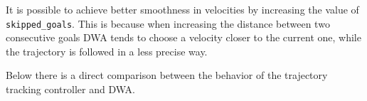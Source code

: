 \documentclass[11pt,a4paper]{article}
\begin{document}
It is possible to achieve better smoothness in velocities by increasing the value
of \texttt{skipped\_goals}.
This is because when increasing the distance between two consecutive goals DWA tends to choose
a velocity closer to the current one, while the trajectory is followed in a less precise way.

Below there is a direct comparison between the behavior of the trajectory tracking controller and DWA.\\

\begin{figure}[H]
    \centering
    \quad
\end{figure}
\end{document}
